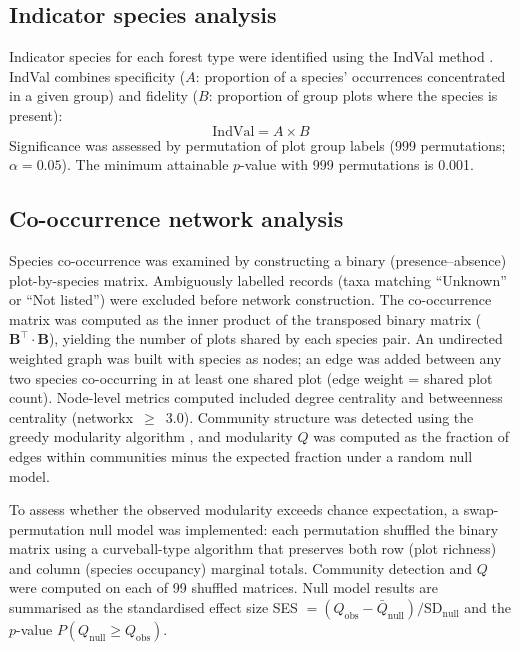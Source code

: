 \documentclass[review,12pt,a4paper]{elsarticle}
\begin{document}
\subsection{Indicator species analysis}
\label{sec:indicator}

Indicator species for each forest type were identified using the IndVal method
\citep{dufresne1997}. IndVal combines specificity ($A$: proportion of a
species' occurrences concentrated in a given group) and fidelity ($B$:
proportion of group plots where the species is present):
\begin{equation}
  \text{IndVal} = A \times B
  \label{eq:indval}
\end{equation}
Significance was assessed by permutation of plot group labels (999
permutations; $\alpha = 0.05$). The minimum attainable $p$-value with 999
permutations is 0.001.

\subsection{Co-occurrence network analysis}
\label{sec:cooccurrence}

Species co-occurrence was examined by constructing a binary
(presence--absence) plot-by-species matrix. Ambiguously labelled records
(taxa matching ``Unknown'' or ``Not listed'') were excluded before network
construction. The co-occurrence matrix was computed as the inner product of
the transposed binary matrix ($\mathbf{B}^\top \cdot \mathbf{B}$), yielding
the number of plots shared by each species pair. An undirected weighted graph
was built with species as nodes; an edge was added between any two species
co-occurring in at least one shared plot (edge weight = shared plot count).
Node-level metrics computed included degree centrality and betweenness
centrality (networkx~$\geq$~3.0). Community structure was detected using the
greedy modularity algorithm \citep{clauset2004}, and modularity $Q$ was
computed as the fraction of edges within communities minus the expected
fraction under a random null model.

To assess whether the observed modularity exceeds chance expectation, a
swap-permutation null model was implemented: each permutation shuffled the
binary matrix using a curveball-type algorithm \citep{strona2014} that
preserves both row (plot richness) and column (species occupancy) marginal
totals. Community detection and $Q$ were computed on each of 99 shuffled
matrices. Null model results are summarised as the standardised effect size
SES $= (Q_{\text{obs}} - \bar{Q}_{\text{null}}) / \text{SD}_{\text{null}}$
and the $p$-value $P(Q_{\text{null}} \geq Q_{\text{obs}})$.
\end{document}
